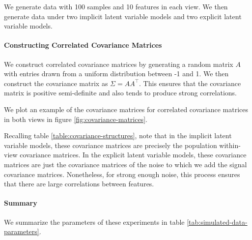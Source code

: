 We generate data with 100 samples and 10 features in each view.
We then generate data under two implicit latent variable models and two explicit latent variable models.

\paragraph{Constructing Correlated Covariance Matrices}

We construct correlated covariance matrices by generating a random matrix $A$ with entries drawn from a uniform distribution between -1 and 1. We then construct the covariance matrix as $\Sigma = AA^\top$. This ensures that the covariance matrix is positive semi-definite and also tends to produce strong correlations.

We plot an example of the covariance matrices for correlated covariance matrices in both views in figure \ref{fig:covariance-matrices}.


Recalling table \ref{table:covariance-structures}, note that in the implicit latent variable models, these covariance matrices are precisely the population within-view covariance matrices.
In the explicit latent variable models, these covariance matrices are just the covariance matrices of the noise to which we add the signal covariance matrices. Nonetheless, for strong enough noise, this process ensures that there are large correlations between features.

\paragraph{Summary} We summarize the parameters of these experiments in table \ref{tab:simulated-data-parameters}.

